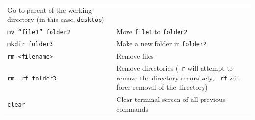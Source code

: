 \documentclass[]{book}
\begin{document}
\begin{longtable}[]{@{}ll@{}}
\begin{minipage}[t]{0.53\columnwidth}
Go to parent of the working directory (in this case, \texttt{desktop})\strut
\end{minipage}\tabularnewline
\begin{minipage}[t]{0.41\columnwidth}\raggedright
\texttt{mv\ “file1”\ folder2}\strut
\end{minipage} & \begin{minipage}[t]{0.53\columnwidth}\raggedright
Move \texttt{file1} to \texttt{folder2}\strut
\end{minipage}\tabularnewline
\begin{minipage}[t]{0.41\columnwidth}\raggedright
\texttt{mkdir\ folder3}\strut
\end{minipage} & \begin{minipage}[t]{0.53\columnwidth}\raggedright
Make a new folder in \texttt{folder2}\strut
\end{minipage}\tabularnewline
\begin{minipage}[t]{0.41\columnwidth}\raggedright
\texttt{rm\ \textless{}filename\textgreater{}}\strut
\end{minipage} & \begin{minipage}[t]{0.53\columnwidth}\raggedright
Remove files\strut
\end{minipage}\tabularnewline
\begin{minipage}[t]{0.41\columnwidth}\raggedright
\texttt{rm\ -rf\ folder3}\strut
\end{minipage} & \begin{minipage}[t]{0.53\columnwidth}\raggedright
Remove directories (\texttt{-r} will attempt to remove the directory recursively, \texttt{-rf} will force removal of the directory)\strut
\end{minipage}\tabularnewline
\begin{minipage}[t]{0.41\columnwidth}\raggedright
\texttt{clear}\strut
\end{minipage} & \begin{minipage}[t]{0.53\columnwidth}\raggedright
Clear terminal screen of all previous commands\strut
\end{minipage}\tabularnewline
\bottomrule
\end{longtable}
\end{document}
